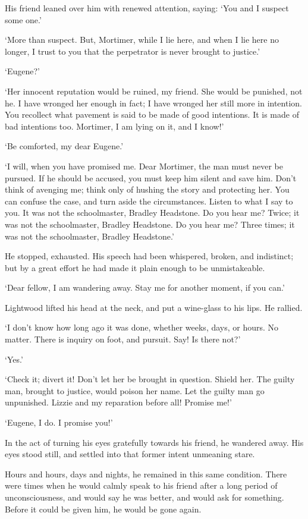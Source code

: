 His friend leaned over him with renewed attention, saying: ‘You and I
suspect some one.’

‘More than suspect. But, Mortimer, while I lie here, and when I lie
here no longer, I trust to you that the perpetrator is never brought to
justice.’

‘Eugene?’

‘Her innocent reputation would be ruined, my friend. She would be
punished, not he. I have wronged her enough in fact; I have wronged her
still more in intention. You recollect what pavement is said to be made
of good intentions. It is made of bad intentions too. Mortimer, I am
lying on it, and I know!’

‘Be comforted, my dear Eugene.’

‘I will, when you have promised me. Dear Mortimer, the man must never be
pursued. If he should be accused, you must keep him silent and save
him. Don’t think of avenging me; think only of hushing the story
and protecting her. You can confuse the case, and turn aside the
circumstances. Listen to what I say to you. It was not the schoolmaster,
Bradley Headstone. Do you hear me? Twice; it was not the schoolmaster,
Bradley Headstone. Do you hear me? Three times; it was not the
schoolmaster, Bradley Headstone.’

He stopped, exhausted. His speech had been whispered, broken, and
indistinct; but by a great effort he had made it plain enough to be
unmistakeable.

‘Dear fellow, I am wandering away. Stay me for another moment, if you
can.’

Lightwood lifted his head at the neck, and put a wine-glass to his lips.
He rallied.

‘I don’t know how long ago it was done, whether weeks, days, or hours.
No matter. There is inquiry on foot, and pursuit. Say! Is there not?’

‘Yes.’

‘Check it; divert it! Don’t let her be brought in question. Shield
her. The guilty man, brought to justice, would poison her name. Let the
guilty man go unpunished. Lizzie and my reparation before all! Promise
me!’

‘Eugene, I do. I promise you!’

In the act of turning his eyes gratefully towards his friend, he
wandered away. His eyes stood still, and settled into that former intent
unmeaning stare.

Hours and hours, days and nights, he remained in this same condition.
There were times when he would calmly speak to his friend after a long
period of unconsciousness, and would say he was better, and would ask
for something. Before it could be given him, he would be gone again.

